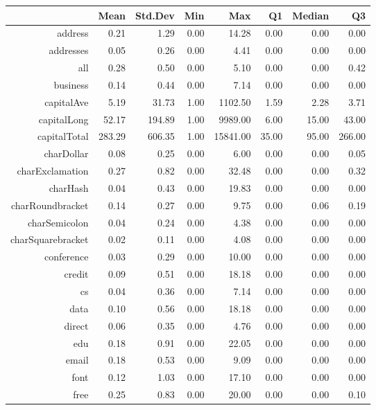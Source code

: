 \documentclass{article}\usepackage[]{graphicx}\usepackage[]{xcolor}
\begin{document}
\begin{table}[ht]
\centering
\begin{tabular}{rrrrrrrr}
  \hline
 & Mean & Std.Dev & Min & Max & Q1 & Median & Q3 \\ 
  \hline
address & 0.21 & 1.29 & 0.00 & 14.28 & 0.00 & 0.00 & 0.00 \\ 
  addresses & 0.05 & 0.26 & 0.00 & 4.41 & 0.00 & 0.00 & 0.00 \\ 
  all & 0.28 & 0.50 & 0.00 & 5.10 & 0.00 & 0.00 & 0.42 \\ 
  business & 0.14 & 0.44 & 0.00 & 7.14 & 0.00 & 0.00 & 0.00 \\ 
  capitalAve & 5.19 & 31.73 & 1.00 & 1102.50 & 1.59 & 2.28 & 3.71 \\ 
  capitalLong & 52.17 & 194.89 & 1.00 & 9989.00 & 6.00 & 15.00 & 43.00 \\ 
  capitalTotal & 283.29 & 606.35 & 1.00 & 15841.00 & 35.00 & 95.00 & 266.00 \\ 
  charDollar & 0.08 & 0.25 & 0.00 & 6.00 & 0.00 & 0.00 & 0.05 \\ 
  charExclamation & 0.27 & 0.82 & 0.00 & 32.48 & 0.00 & 0.00 & 0.32 \\ 
  charHash & 0.04 & 0.43 & 0.00 & 19.83 & 0.00 & 0.00 & 0.00 \\ 
  charRoundbracket & 0.14 & 0.27 & 0.00 & 9.75 & 0.00 & 0.06 & 0.19 \\ 
  charSemicolon & 0.04 & 0.24 & 0.00 & 4.38 & 0.00 & 0.00 & 0.00 \\ 
  charSquarebracket & 0.02 & 0.11 & 0.00 & 4.08 & 0.00 & 0.00 & 0.00 \\ 
  conference & 0.03 & 0.29 & 0.00 & 10.00 & 0.00 & 0.00 & 0.00 \\ 
  credit & 0.09 & 0.51 & 0.00 & 18.18 & 0.00 & 0.00 & 0.00 \\ 
  cs & 0.04 & 0.36 & 0.00 & 7.14 & 0.00 & 0.00 & 0.00 \\ 
  data & 0.10 & 0.56 & 0.00 & 18.18 & 0.00 & 0.00 & 0.00 \\ 
  direct & 0.06 & 0.35 & 0.00 & 4.76 & 0.00 & 0.00 & 0.00 \\ 
  edu & 0.18 & 0.91 & 0.00 & 22.05 & 0.00 & 0.00 & 0.00 \\ 
  email & 0.18 & 0.53 & 0.00 & 9.09 & 0.00 & 0.00 & 0.00 \\ 
  font & 0.12 & 1.03 & 0.00 & 17.10 & 0.00 & 0.00 & 0.00 \\ 
  free & 0.25 & 0.83 & 0.00 & 20.00 & 0.00 & 0.00 & 0.10 \\ 

\end{tabular}
\end{table}
\end{document}
